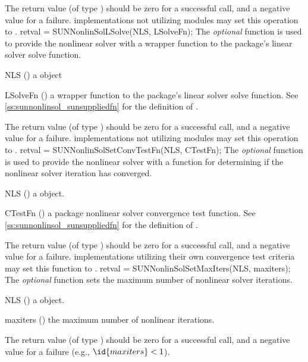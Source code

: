 {
  The return value  (of type ) should be zero for a
  successful call, and a negative value for a failure.
}
{
  {\sunnonlinsol} implementations not utilizing {\sunlinsol} modules
  may set this operation to .
}
{
  retval = SUNNonlinSolLSolve(NLS, LSolveFn);
}
{
  The \textit{optional} function  is used to
  provide the nonlinear solver with a wrapper function to the
  {\sundials} package's linear solver solve function.
}
{
  \begin{args}[LSolveFn]
  \item[NLS] ()
    a {\sunnonlinsol} object
  \item[LSolveFn] ()
    a wrapper function to the {\sundials} package's linear solver
    solve function. See \ref{ss:sunnonlinsol_sunsuppliedfn} for the
    definition of .
  \end{args}
}
{
  The return value  (of type ) should be zero for a
  successful call, and a negative value for a failure.
}
{
  {\sunnonlinsol} implementations not utilizing {\sunlinsol} modules
  may set this operation to .
}
{
  retval = SUNNonlinSolSetConvTestFn(NLS, CTestFn);
}
{
  The \textit{optional} function  is
  used to provide the nonlinear solver with a function for determining
  if the nonlinear solver iteration has converged.
}
{
  \begin{args}[CTestFn]
  \item[NLS] ()
    a {\sunnonlinsol} object.
  \item[CTestFn] ()
    a {\sundials} package nonlinear solver convergence test function.
    See \ref{ss:sunnonlinsol_sunsuppliedfn} for the definition of
    .
  \end{args}
}
{
  The return value  (of type ) should be zero for a
  successful call, and a negative value for a failure.
}
{
  {\sunnonlinsol} implementations utilizing their own convergence test
  criteria may set this function to .
}
{
  retval = SUNNonlinSolSetMaxIters(NLS, maxiters);
}
{
  The \textit{optional} function  sets the
  maximum number of nonlinear solver iterations.
}
{
  \begin{args}[maxiters]
  \item[NLS] ()
    a {\sunnonlinsol} object.
  \item[maxiters] ()
    the maximum number of nonlinear iterations.
  \end{args}
}
{
  The return value  (of type ) should be zero for a
  successful call, and a negative value for a failure
  (e.g., $\id{maxiters} < 1$).
}
{}


